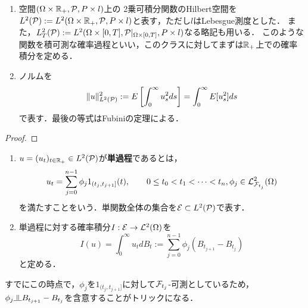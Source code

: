 \documentclass[uplatex,dvipdfmx]{jsreport}
\begin{document}
\begin{notation}[確率積分を定義する過程のクラス]\mbox{}
    \begin{enumerate}
        \item 空間$(\Omega\times\mathbb{R}_+,\mathcal{P},P\times l)$上の
        2乗可積分関数のHilbert空間を$L^2(\mathcal{P}):=L^2(\Omega\times\mathbb{R}_+,\mathcal{P},P\times l)$と表す，ただし$l$はLebesgue測度とした．
        また，$L^2_T(\mathcal{P}):=L^2(\Omega\times[0,T],\mathcal{P}|_{\Omega\times[0,T]},P\times l)$なる略記も用いる．
        このような関数を積可測な確率過程といい，このクラスに対してまずは$\mathbb{R}_+$上での確率積分を定める．
        \item ノルムを
        \[\|u\|^2_{L^2(\mathcal{P})}:=E\left[\int^\infty_{0}u_s^2ds\right]=\int^\infty_0E[u^2_s]ds\]
        で表す．最後の等式はFubiniの定理による．
    \end{enumerate}
\end{notation}
\begin{proof}
    
\end{proof}

\begin{definition}\mbox{}
    \begin{enumerate}
        \item 
        $u=(u_t)_{t\in\mathbb{R}_+}\in L^2(\mathcal{P})$が\textbf{単過程}であるとは，
        \[u_t=\sum_{j=0}^{n-1}\phi_j1_{(t_j,t_{j+1}]}(t),\qquad 0\le t_0<t_1<\cdots<t_n,\phi_j\in\mathcal{L}^2_{\mathcal{F}_{t_j}}(\Omega)\]
        を満たすことをいう．単関数全体の集合を$\mathcal{E}\subset L^2(\mathcal{P})$で表す．
        \item 単過程に対する確率積分$I:\mathcal{E}\to\mathcal{L}^2(\Omega)$を
        \[I(u)=\int^\infty_0 u_tdB_t:=\sum^{n-1}_{j=0}\phi_j(B_{t_{j+1}}-B_{t_j})\]
        と定める．
    \end{enumerate}
\end{definition}
\begin{remarks}
    すでにこの時点で，$\phi_j$を$1_{(t_j,t_{j+1}]}$に対して$\mathcal{F}_{t_j}$-可測としているため，$\phi_j\indep B_{t_{j+1}}-B_{t_j}$を含意することがトリックになる．
\end{remarks}
\end{document}
